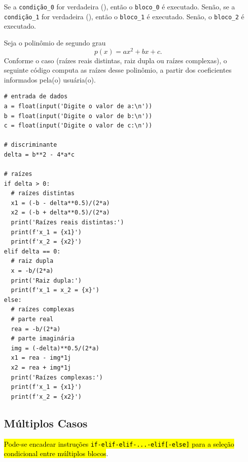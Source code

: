 Se a \lstinline+condição_0+ for verdadeira ({\PYTHONTrue}), então o \lstinline+bloco_0+ é executado. Senão, se a \lstinline+condição_1+ for verdadeira ({\PYTHONTrue}), então o \lstinline+bloco_1+ é executado. Senão, o \lstinline+bloco_2+ é executado.

\begin{ex}
  Seja o polinômio de segundo grau
  \begin{equation}
    p(x) = ax^2 + bx + c.
  \end{equation}
  Conforme o caso (raízes reais distintas, raiz dupla ou raízes complexas), o seguinte código computa as raízes desse polinômio, a partir dos coeficientes informados pela(o) usuária(o).

\begin{lstlisting}
# entrada de dados
a = float(input('Digite o valor de a:\n'))
b = float(input('Digite o valor de b:\n'))
c = float(input('Digite o valor de c:\n'))

# discriminante
delta = b**2 - 4*a*c

# raízes
if delta > 0:
  # raízes distintas
  x1 = (-b - delta**0.5)/(2*a)
  x2 = (-b + delta**0.5)/(2*a)
  print('Raízes reais distintas:')
  print(f'x_1 = {x1}')
  print(f'x_2 = {x2}')
elif delta == 0:
  # raiz dupla
  x = -b/(2*a)
  print('Raiz dupla:')
  print(f'x_1 = x_2 = {x}')
else:
  # raízes complexas
  # parte real
  rea = -b/(2*a)
  # parte imaginária
  img = (-delta)**0.5/(2*a)
  x1 = rea - img*1j
  x2 = rea + img*1j
  print('Raízes complexas:')
  print(f'x_1 = {x1}')
  print(f'x_2 = {x2}')
\end{lstlisting}

\end{ex}

\subsection{Múltiplos Casos}

\hl{Pode-se encadear instruções \texttt{if-elif-elif-...-elif[-else]} para a seleção condicional entre múltiplos blocos}.

